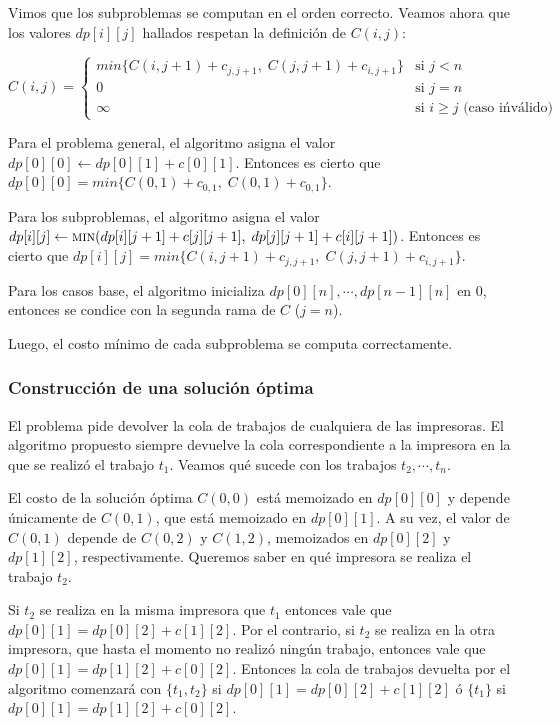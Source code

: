 \documentclass[a4paper, 10pt, twoside]{article}
\begin{document}
Vimos que los subproblemas se computan en el orden correcto. Veamos ahora que los valores $dp[i][j]$ hallados respetan la definición de $C(i, j)$:

$$
C(i, j) =
\left\{
  \begin{array}{ll}
    min\{ C(i, j + 1) + c_{j, j + 1}, \; C(j, j + 1) + c_{i, j + 1} \} & \mbox{si } j < n \\
    0                                                                  & \mbox{si } j = n \\
    \infty                                                             & \mbox{si } i \geq j \mbox{ (caso ińválido)}
  \end{array}
\right.
$$

Para el problema general, el algoritmo asigna el valor $dp[0][0] \leftarrow dp[0][1] + c[0][1]$. Entonces es cierto que $dp[0][0] = min\{ C(0, 1) + c_{0, 1}, \; C(0, 1) + c_{0, 1} \}$.

Para los subproblemas, el algoritmo asigna el valor $dp[i][j] \leftarrow \textsc{min}(dp[i][j + 1] + c[j][j + 1], \; dp[j][j + 1] + c[i][j + 1])$. Entonces es cierto que $dp[i][j] =min\{ C(i, j + 1) + c_{j, j + 1}, \; C(j, j + 1) + c_{i, j + 1} \}$.

Para los casos base, el algoritmo inicializa $dp[0][n], \cdots, dp[n - 1][n]$ en 0, entonces se condice con la segunda rama de $C$ ($j = n$).

Luego, el costo mínimo de cada subproblema se computa correctamente.


\subsubsection{Construcción de una solución óptima}

El problema pide devolver la cola de trabajos de cualquiera de las impresoras. El algoritmo propuesto siempre devuelve la cola correspondiente a la impresora en la que se realizó el trabajo $t_1$. Veamos qué sucede con los trabajos $t_2, \cdots, t_n$.

El costo de la solución óptima $C(0, 0)$ está memoizado en $dp[0][0]$ y depende únicamente de $C(0, 1)$, que está memoizado en $dp[0][1]$. A su vez, el valor de $C(0, 1)$ depende de $C(0, 2)$ y $C(1, 2)$, memoizados en $dp[0][2]$ y $dp[1][2]$, respectivamente. Queremos saber en qué impresora se realiza el trabajo $t_2$.

Si $t_2$ se realiza en la misma impresora que $t_1$ entonces vale que $dp[0][1] = dp[0][2] + c[1][2]$. Por el contrario, si $t_2$ se realiza en la otra impresora, que hasta el momento no realizó ningún trabajo, entonces vale que $dp[0][1] = dp[1][2] + c[0][2]$. Entonces la cola de trabajos devuelta por el algoritmo comenzará con $\{ t_1, t_2 \}$ si $dp[0][1] = dp[0][2] + c[1][2]$ ó $\{ t_1 \}$ si $dp[0][1] = dp[1][2] + c[0][2]$.
\end{document}
